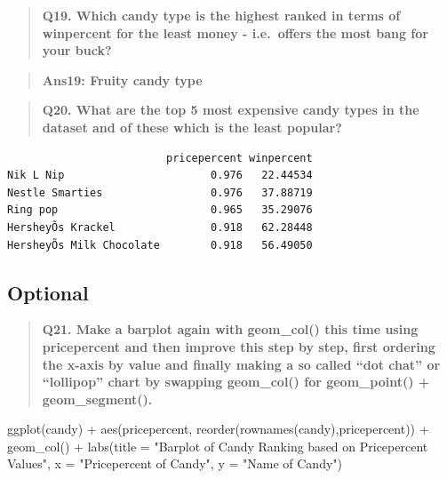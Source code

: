 \documentclass[
  letterpaper,
  DIV=11,
  numbers=noendperiod]{scrartcl}
\newenvironment{Shaded}{\begin{snugshade}}{\end{snugshade}}
\newcommand{\AttributeTok}[1]{\textcolor[rgb]{0.40,0.45,0.13}{#1}}
\newcommand{\ConstantTok}[1]{\textcolor[rgb]{0.56,0.35,0.01}{#1}}
\newcommand{\DecValTok}[1]{\textcolor[rgb]{0.68,0.00,0.00}{#1}}
\newcommand{\FunctionTok}[1]{\textcolor[rgb]{0.28,0.35,0.67}{#1}}
\newcommand{\NormalTok}[1]{\textcolor[rgb]{0.00,0.23,0.31}{#1}}
\newcommand{\OtherTok}[1]{\textcolor[rgb]{0.00,0.23,0.31}{#1}}
\newcommand{\SpecialCharTok}[1]{\textcolor[rgb]{0.37,0.37,0.37}{#1}}
\newcommand{\StringTok}[1]{\textcolor[rgb]{0.13,0.47,0.30}{#1}}
\begin{document}
\begin{quote}
\textbf{Q19. Which candy type is the highest ranked in terms of
winpercent for the least money - i.e.~offers the most bang for your
buck?}
\end{quote}

\begin{quote}
\textbf{Ans19: Fruity candy type}
\end{quote}

\begin{quote}
\textbf{Q20. What are the top 5 most expensive candy types in the
dataset and of these which is the least popular?}
\end{quote}

\begin{Shaded}
\end{Shaded}

\begin{verbatim}
                         pricepercent winpercent
Nik L Nip                       0.976   22.44534
Nestle Smarties                 0.976   37.88719
Ring pop                        0.965   35.29076
HersheyÕs Krackel               0.918   62.28448
HersheyÕs Milk Chocolate        0.918   56.49050
\end{verbatim}

\hypertarget{optional}{%
\subsection{Optional}\label{optional}}

\begin{quote}
\textbf{Q21. Make a barplot again with geom\_col() this time using
pricepercent and then improve this step by step, first ordering the
x-axis by value and finally making a so called ``dot chat'' or
``lollipop'' chart by swapping geom\_col() for geom\_point() +
geom\_segment().}
\end{quote}

\begin{Shaded}
\begin{Highlighting}[]
\FunctionTok{ggplot}\NormalTok{(candy) }\SpecialCharTok{+} 
  \FunctionTok{aes}\NormalTok{(pricepercent, }\FunctionTok{reorder}\NormalTok{(}\FunctionTok{rownames}\NormalTok{(candy),pricepercent)) }\SpecialCharTok{+}
  \FunctionTok{geom\_col}\NormalTok{() }\SpecialCharTok{+}
  \FunctionTok{labs}\NormalTok{(}\AttributeTok{title =} \StringTok{"Barplot of Candy Ranking based on Pricepercent Values"}\NormalTok{, }
       \AttributeTok{x =} \StringTok{"Pricepercent of Candy"}\NormalTok{, }\AttributeTok{y =} \StringTok{"Name of Candy"}\NormalTok{)}
\end{Highlighting}
\end{Shaded}
\end{document}

